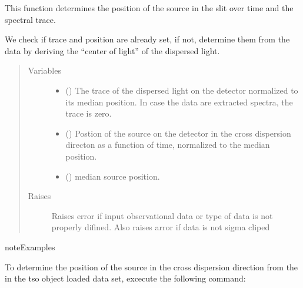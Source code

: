 \documentclass[a4paper,10pt,english]{sphinxmanual}
\begin{document}
\begin{fulllineitems}
\begin{fulllineitems}
\end{fulllineitems}


\begin{fulllineitems}
\label{\detokenize{cascade.TSO:cascade.TSO.TSO.TSOSuite.determine_source_position}}
This function determines the position of the source in the slit
over time and the spectral trace.

We check if trace and position are already set, if not, determine them
from the data by deriving the “center of light” of the dispersed
light.
\begin{quote}\begin{description}
\item[{Variables}] \leavevmode\begin{itemize}
\item {} 
 () \textendash{} The trace of the dispersed light on the detector normalized
to its median position. In case the data are extracted spectra,
the trace is zero.

\item {} 
 () \textendash{} Postion of the source on the detector in the cross dispersion
directon as a function of time, normalized to the
median position.

\item {} 
 () \textendash{} median source position.

\end{itemize}

\item[{Raises}] \leavevmode
{} \textendash{} Raises error if input observational data or type of data is
not properly difined. Also raises arror if data is not sigma cliped

\end{description}\end{quote}

\begin{sphinxadmonition}{note}{Examples}

To determine the position of the source in the cross dispersion
direction from the in the tso object loaded data set, excecute the
following command:


\end{sphinxadmonition}
\end{fulllineitems}
\end{fulllineitems}
\end{document}
